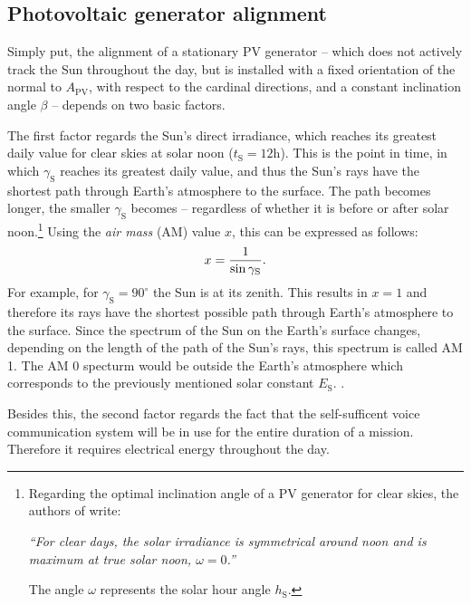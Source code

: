 \subsection{Photovoltaic generator alignment} \label{sec:photovoltaic_generator_alignment}
Simply put, the alignment of a stationary PV generator -- which does not actively track the Sun throughout the day, but is installed with a fixed orientation of the normal to $A_{\mathrm{PV}}$, with respect to the cardinal directions, and a constant inclination angle $\beta$ -- depends on two basic factors.

The first factor regards the Sun's direct irradiance, which reaches its greatest daily value for clear skies at solar noon ($t_{\mathrm{S}} = 12\mathrm{h}$). This is the point in time, in which $\gamma_{\mathrm{S}}$ reaches its greatest daily value, and thus the Sun's rays have the shortest path through Earth's atmosphere to the surface. The path becomes longer, the smaller $\gamma_{\mathrm{S}}$ becomes -- regardless of whether it is before or after solar noon.\footnote{Regarding the optimal inclination angle of a PV generator for clear skies, the authors of \cite[7]{Landis:1995} write: \begin{displayquote}\textit{``For clear days, the solar irradiance is symmetrical around noon and is maximum at true solar noon, $\omega = 0$.''}\end{displayquote} The angle $\omega$ represents the solar hour angle $h_{\mathrm{S}}$.} Using the \emph{air mass} (AM) value $x$, this can be expressed as follows:
	\begin{equation} \label{eq:air_mass}
	\centering
		x = \frac{1}{\sin \gamma_{\mathrm{S}}} \text{.}
	\end{equation}
For example, for $\gamma_{\mathrm{S}} = 90^\circ$  the Sun is at its zenith. This results in $x = 1$ and therefore its rays have the shortest possible path through Earth's atmosphere to the surface. Since the spectrum of the Sun on the Earth's surface changes, depending on the length of the path of the Sun's rays, this spectrum is called AM 1. The AM 0 specturm would be outside the Earth's atmosphere which corresponds to the previously mentioned solar constant $E_{\mathrm{S}}$.  \cite{Landis:1995, Bertol:2011, Mertens:2015, Wagner:2018}. 

Besides this, the second factor regards the fact that the self-sufficent voice communication system will be in use for the entire duration of a mission. Therefore it requires electrical energy throughout the day.

